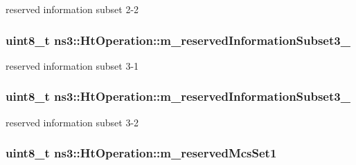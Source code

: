 reserved information subset 2-\/2 

\subsubsection[{\texorpdfstring{m\+\_\+reserved\+Information\+Subset3\+\_\+1}{m_reservedInformationSubset3_1}}]{\setlength{\rightskip}{0pt plus 5cm}uint8\+\_\+t ns3\+::\+Ht\+Operation\+::m\+\_\+reserved\+Information\+Subset3\+\_\hspace{0.3cm}{\ttfamily [private]}}\hypertarget{classns3_1_1HtOperation_a317336a2eb67611aeaa820cae128f578}{}\label{classns3_1_1HtOperation_a317336a2eb67611aeaa820cae128f578}


reserved information subset 3-\/1 

\subsubsection[{\texorpdfstring{m\+\_\+reserved\+Information\+Subset3\+\_\+2}{m_reservedInformationSubset3_2}}]{\setlength{\rightskip}{0pt plus 5cm}uint8\+\_\+t ns3\+::\+Ht\+Operation\+::m\+\_\+reserved\+Information\+Subset3\+\_\hspace{0.3cm}{\ttfamily [private]}}\hypertarget{classns3_1_1HtOperation_a42e4e5921c9351e83a8f0f3316e14da3}{}\label{classns3_1_1HtOperation_a42e4e5921c9351e83a8f0f3316e14da3}


reserved information subset 3-\/2 

\subsubsection[{\texorpdfstring{m\+\_\+reserved\+Mcs\+Set1}{m_reservedMcsSet1}}]{\setlength{\rightskip}{0pt plus 5cm}uint8\+\_\+t ns3\+::\+Ht\+Operation\+::m\+\_\+reserved\+Mcs\+Set1\hspace{0.3cm}{\ttfamily [private]}}\hypertarget{classns3_1_1HtOperation_a7cab160c501ebb72cd4a4847dfda4b5d}{}\label{classns3_1_1HtOperation_a7cab160c501ebb72cd4a4847dfda4b5d}


